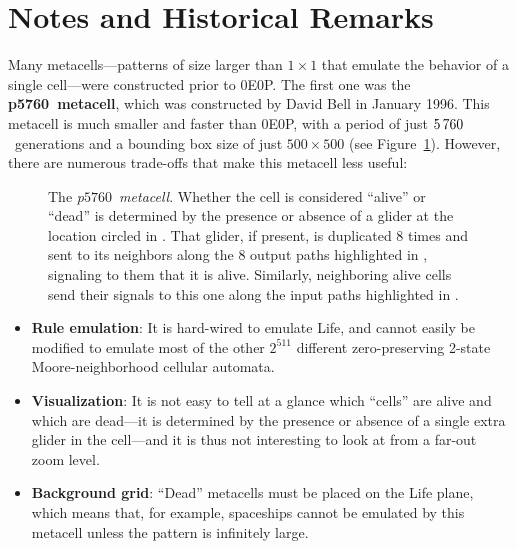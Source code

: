 \section{Notes and Historical Remarks}\label{sec:0e0p_history}

Many metacells---patterns of size larger than $1 \times 1$ that emulate the behavior of a single cell---were constructed prior to 0E0P. The first one was the \textbf{p5760~metacell}, which was constructed by David Bell in January 1996. This metacell is much smaller and faster than 0E0P, with a period of just $5{\,}760$~generations and a bounding box size of just $500 \times 500$ (see Figure~\ref{fig:p5760_metacell}). However, there are numerous trade-offs that make this metacell less useful:\smallskip

\begin{figure}[!htb]
	\centering
	\caption{The \emph{p$5760$~metacell}. Whether the cell is considered ``alive'' or ``dead'' is determined by the presence or absence of a glider at the location circled in . That glider, if present, is duplicated $8$ times and sent to its neighbors along the $8$ output paths highlighted in , signaling to them that it is alive. Similarly, neighboring alive cells send their signals to this one along the input paths highlighted in .}\label{fig:p5760_metacell}
\end{figure}

\begin{itemize}
	\item \textbf{Rule emulation}: It is hard-wired to emulate Life, and cannot easily be modified to emulate most of the other $2^{511}$ different zero-preserving 2-state Moore-neighborhood cellular automata.\smallskip
	
	\item \textbf{Visualization}: It is not easy to tell at a glance which ``cells'' are alive and which are dead---it is determined by the presence or absence of a single extra glider in the cell---and it is thus not interesting to look at from a far-out zoom level.\smallskip
	
	\item \textbf{Background grid}: ``Dead'' metacells must be placed on the Life plane, which means that, for example, spaceships cannot be emulated by this metacell unless the pattern is infinitely large.\smallskip
\end{itemize}

